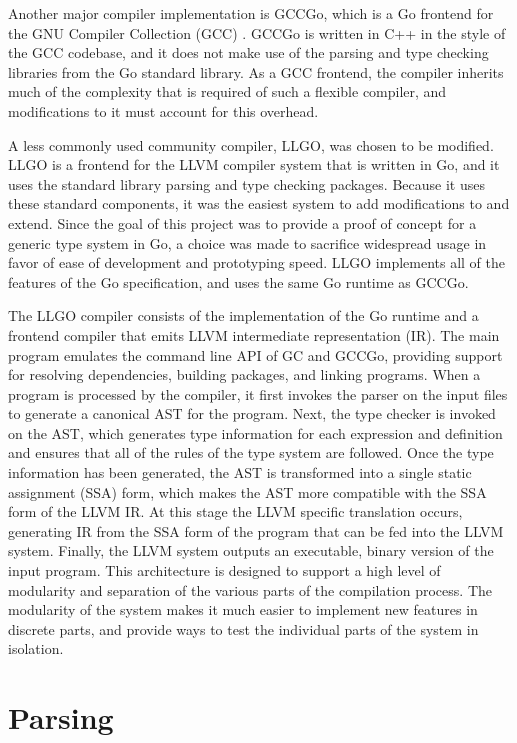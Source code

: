\documentclass[letterpaper,11pt]{article}
\begin{document}
 Another major compiler implementation is GCCGo, which is a Go frontend for the GNU Compiler Collection (GCC) \cite{gcc}. GCCGo is written in C++ in the style of the GCC codebase, and it does not make use of the parsing and type checking libraries from the Go standard library. As a GCC frontend, the compiler inherits much of the complexity that is required of such a flexible compiler, and modifications to it must account for this overhead.

A less commonly used community compiler, LLGO, was chosen to be modified. LLGO is a frontend for the LLVM compiler system \cite{llvm} that is written in Go, and it uses the standard library parsing and type checking packages. Because it uses these standard components, it was the easiest system to add modifications to and extend. Since the goal of this project was to provide a proof of concept for a generic type system in Go, a choice was made to sacrifice widespread usage in favor of ease of development and prototyping speed. LLGO implements all of the features of the Go specification, and uses the same Go runtime as GCCGo.

The LLGO compiler consists of the implementation of the Go runtime and a frontend compiler that emits LLVM intermediate representation (IR). The main program emulates the command line API of GC and GCCGo, providing support for resolving dependencies, building packages, and linking programs. When a program is processed by the compiler, it first invokes the parser on the input files to generate a canonical AST for the program. Next, the type checker is invoked on the AST, which generates type information for each expression and definition and ensures that all of the rules of the type system are followed. Once the type information has been generated, the AST is transformed into a single static assignment (SSA) \cite{ssa} form, which makes the AST more compatible with the SSA form of the LLVM IR. At this stage the LLVM specific translation occurs, generating IR from the SSA form of the program that can be fed into the LLVM system. Finally, the LLVM system outputs an executable, binary version of the input program. This architecture is designed to support a high level of modularity and separation of the various parts of the compilation process. The modularity of the system makes it much easier to implement new features in discrete parts, and provide ways to test the individual parts of the system in isolation.

\section{Parsing} \label{parsing}
\end{document}

